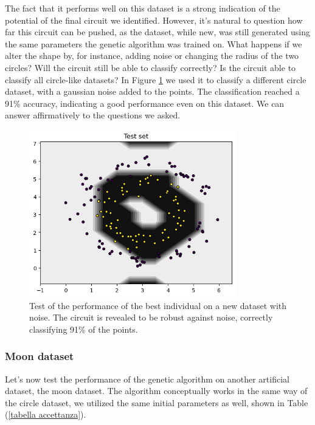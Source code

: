 \documentclass[12pt]{article}
\begin{document}
The fact that it performs well on this dataset is a strong indication of the potential of the final circuit we identified. However, it's natural to question how far this circuit can be pushed, as the dataset, while new, was still generated using the same parameters the genetic algorithm was trained on. What happens if we alter the shape by, for instance, adding noise or changing the radius of the two circles? Will the circuit still be able to classify correctly? Is the circuit able to classify all circle-like datasets? In Figure \ref{fig:noise} we used it to classify a different circle dataset, with a gaussian noise added to the points. The classification reached a 91\% accuracy, indicating a good performance even on this dataset. We can answer affirmatively to the questions we asked.  
\begin{figure}[h!]
    \centering
    \includegraphics[width=0.8\textwidth]{images/noise.png}
    \caption{Test of the performance of the best individual on a new dataset with noise. The circuit is revealed to be robust against noise, correctly classifying 91\% of the points.}
    \label{fig:noise}
\end{figure}

\subsubsection{Moon dataset}

Let's now test the performance of the genetic algorithm on another artificial dataset, the moon dataset.\cite{pedregosa2011} The algorithm conceptually works in the same way of the circle dataset, we utilized the same initial parameters as well, shown in Table (\ref{tabella accettanza}).
\end{document}
